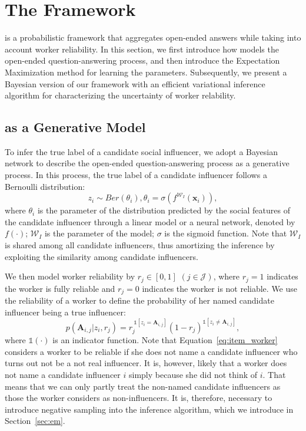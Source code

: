 \section{The \sys Framework}

\sys is a probabilistic framework that aggregates open-ended answers while taking into account worker reliability. In this section, we first introduce how \sys models the open-ended question-answering process, and then introduce the Expectation Maximization method for learning the parameters. Subsequently, we present a Bayesian version of our framework with an efficient variational inference algorithm for characterizing the uncertainty of worker relability. 

\subsection{\sys as a Generative Model}
To infer the true label of a candidate social influencer, we adopt a Bayesian network to describe the open-ended question-answering process as a generative process. In this process, the true label of a candidate influencer follows a Bernoulli distribution:
%
\begin{equation}
    z_i \sim Ber(\theta_i), \theta_i  = \sigma (f^{\mathcal{W}_I}(\mathbf{x}_i)),
    \label{eq:dis_item}
\end{equation}
%
where $\theta_i$ is the parameter of the distribution predicted by the social features of the candidate influencer through a linear model or a neural network, denoted by $f(\cdot)$; $\mathcal{W}_I$ is the parameter of the model; $\sigma$ is the sigmoid function. Note that $\mathcal{W}_I$ is shared among all candidate influencers, thus amortizing the inference \cite{gershman2014amortized} by exploiting the similarity among candidate influencers. 


We then model worker reliability by $r_j \in [0,1]$ $(j\in \mathcal{J})$, where $r_j=1$ indicates the worker is fully reliable and $r_j=0$ indicates the worker is not reliable. We use the reliability of a worker to define the probability of her named candidate influencer being a true influencer:
%
\begin{equation}
    p(\mathbf{A}_{i,j} | z_i,  r_j) = r_j^{\ \mathds{1}[z_i=\mathbf{A}_{i,j}]} (1- r_j)^{\mathds{1}[z_i\ne \mathbf{A}_{i,j}]},
    \label{eq:item_worker}
\end{equation}
%
where $\mathds{1}(\cdot)$ is an indicator function. Note that Equation~\ref{eq:item_worker} considers a worker to be reliable if she does not name a candidate influencer who turns out not be a not real influencer. It is, however, likely that a worker does not name a candidate influencer $i$ simply because she did not think of $i$. That means that we can only partly treat the non-named candidate influencers as those the worker considers as non-influencers. It is, therefore, necessary to introduce negative sampling into the inference algorithm, which we introduce in Section~\ref{sec:em}. 


